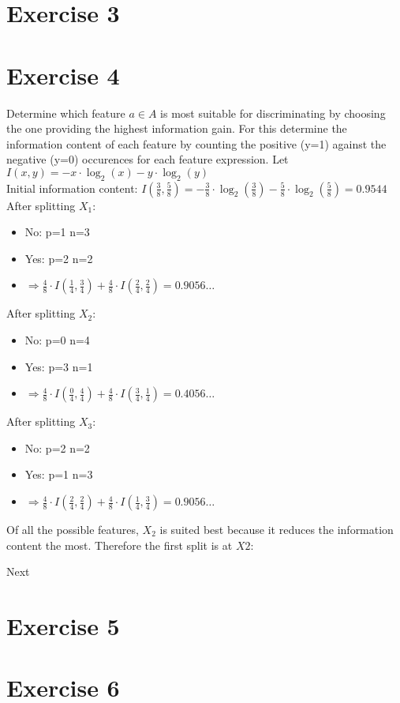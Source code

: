 \documentclass[12pt]{article}
\begin{document}
\section*{Exercise 3}
\section*{Exercise 4}
Determine which feature $a\in A$ is most suitable for discriminating by choosing the one providing the highest information gain. For this determine the information content of each feature by counting the positive (y=1) against the negative (y=0) occurences for each feature expression. Let $I(x,y)=-x\cdot \log_2(x)-y\cdot \log_2(y)$\\
Initial information content: $I(\frac{3}{8},\frac{5}{8})=-\frac{3}{8}\cdot\log_2(\frac{3}{8})-\frac{5}{8}\cdot\log_2(\frac{5}{8})=0.9544$\\
After splitting $X_1$:
\begin{itemize}
\item No: p=1 n=3
\item Yes: p=2 n=2
\item $\Rightarrow \frac{4}{8}\cdot I(\frac{1}{4},\frac{3}{4}) + \frac{4}{8}\cdot I(\frac{2}{4},\frac{2}{4}) = 0.9056\dots$
\end{itemize}
After splitting $X_2$:
\begin{itemize}
\item No: p=0 n=4
\item Yes: p=3 n=1
\item $\Rightarrow \frac{4}{8}\cdot I(\frac{0}{4},\frac{4}{4}) + \frac{4}{8}\cdot I(\frac{3}{4},\frac{1}{4}) = 0.4056\dots$
\end{itemize}
After splitting $X_3$:
\begin{itemize}
\item No: p=2 n=2
\item Yes: p=1 n=3
\item $\Rightarrow \frac{4}{8}\cdot I(\frac{2}{4},\frac{2}{4}) + \frac{4}{8}\cdot I(\frac{1}{4},\frac{3}{4}) = 0.9056\dots$
\end{itemize}
Of all the possible features, $X_2$ is suited best because it reduces the information content the most. Therefore the first split is at $X2$:\\
Next 


\section*{Exercise 5}
\section*{Exercise 6}
\end{document}
